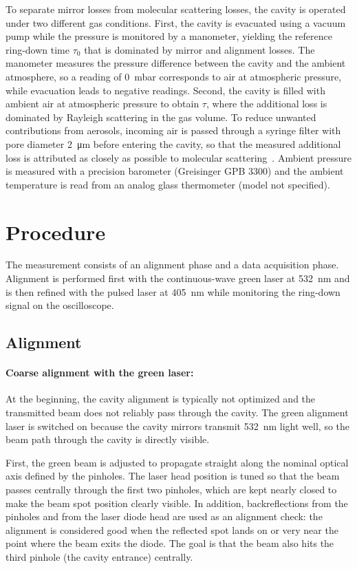 \documentclass[a4paper]{article}
\begin{document}
To separate mirror losses from molecular scattering losses, the cavity is operated under two different gas conditions.
First, the cavity is evacuated using a vacuum pump while the pressure is monitored by a manometer, yielding the reference ring-down time $\tau_0$ that is dominated by mirror and alignment losses.
The manometer measures the pressure difference between the cavity and the ambient atmosphere, so a reading of \SI{0}{mbar} corresponds to air at atmospheric pressure, while evacuation leads to negative readings.
Second, the cavity is filled with ambient air at atmospheric pressure to obtain $\tau$, where the additional loss is dominated by Rayleigh scattering in the gas volume.
To reduce unwanted contributions from aerosols, incoming air is passed through a syringe filter with pore diameter \SI{2}{\micro\meter} before entering the cavity, so that the measured additional loss is attributed as closely as possible to molecular scattering~\cite{RAYAnleitung}.
Ambient pressure is measured with a precision barometer (Greisinger GPB 3300) and the ambient temperature is read from an analog glass thermometer (model not specified).

\section{Procedure}
\label{sec:procedure}

The measurement consists of an alignment phase and a data acquisition phase.
Alignment is performed first with the continuous-wave green laser at \SI{532}{nm} and is then refined with the pulsed laser at \SI{405}{nm} while monitoring the ring-down signal on the oscilloscope.

\subsection{Alignment}

\paragraph{Coarse alignment with the green laser:}
At the beginning, the cavity alignment is typically not optimized and the transmitted beam does not reliably pass through the cavity.
The green alignment laser is switched on because the cavity mirrors transmit \SI{532}{nm} light well, so the beam path through the cavity is directly visible.

First, the green beam is adjusted to propagate straight along the nominal optical axis defined by the pinholes.
The laser head position is tuned so that the beam passes centrally through the first two pinholes, which are kept nearly closed to make the beam spot position clearly visible.
In addition, backreflections from the pinholes and from the laser diode head are used as an alignment check: the alignment is considered good when the reflected spot lands on or very near the point where the beam exits the diode.
The goal is that the beam also hits the third pinhole (the cavity entrance) centrally.
\end{document}
